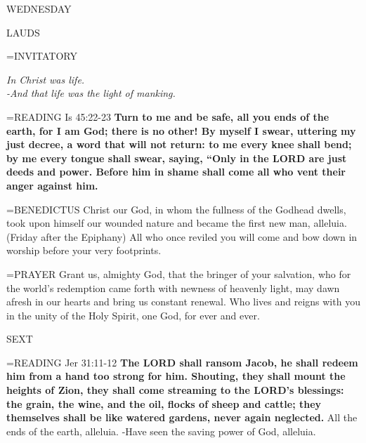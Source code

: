 \begin{center}
\normalsize WEDNESDAY
\end{center}

\begin{flushleft}\normalsize LAUDS\\\end{flushleft}
\hangindent=\parindent \small{INVITATORY}
\begin{center}
\textit{In Christ was life.\\}
\textit{-And that life was the light of manking.\\}
\end{center}

\hangindent=\parindent \small{READING}    Is 45:22-23 \textbf{   Turn to me and be safe, all you ends of the earth, for I am God; there is no other! By myself I swear, uttering my just decree, a word that will not return: to me every knee shall bend; by me every tongue shall swear, saying, “Only in the LORD are just deeds and power. Before him in shame shall come all who vent their anger against him.\\}

\hangindent=\parindent \small{BENEDICTUS 	Christ our God, in whom the fullness of the Godhead dwells, took upon himself our wounded nature and became the first new man, alleluia.\\}
(Friday after the Epiphany)
All who once reviled you will come and bow down in worship before your very footprints.

\hangindent=\parindent \small{PRAYER 	Grant us, almighty God, that the bringer of your salvation, who for the world's redemption came forth with newness of heavenly light, may dawn afresh in our hearts and bring us constant renewal. Who lives and reigns with you in the unity of the Holy Spirit, one God, for ever and ever.}

\begin{flushleft}\normalsize SEXT\\\end{flushleft}
\hangindent=\parindent \small{READING}    Jer 31:11-12 \textbf{   The LORD shall ransom Jacob, he shall redeem him from a hand too strong for him. Shouting, they shall mount the heights of Zion, they shall come streaming to the LORD’s blessings: the grain, the wine, and the oil, flocks of sheep and cattle; they themselves shall be like watered gardens, never again neglected.}
All the ends of the earth, alleluia.
-Have seen the saving power of God, alleluia.

